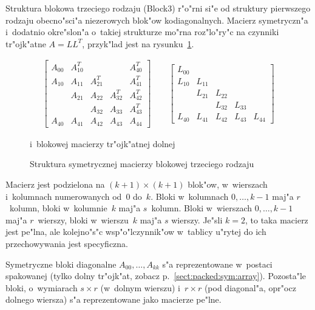 Struktura blokowa trzeciego rodzaju (Block3) r"o"rni si"e od struktury
pierwszego rodzaju obecno"sci"a niezerowych blok"ow kodiagonalnych.
Macierz symetryczn"a i~dodatnio okre"slon"a o~takiej strukturze mo"rna
roz"lo"ry"c na czynniki tr"ojk"atne $A=LL^T$, 
przyk"lad jest na rysunku~\ref{fig:block3:sympos}.
\begin{figure}[ht]
  \begin{align*}
    \left[\begin{array}{ccccc}
      A_{00} & A_{10}^T & & & A_{40}^T \\
      A_{10} & A_{11} & A_{21}^T & & A_{41}^T \\
      & A_{21} & A_{22} & A_{32}^T & A_{42}^T \\
      & & A_{32} & A_{33} & A_{43}^T \\
      A_{40} & A_{41} & A_{42} & A_{43} & A_{44}
    \end{array}\right] \qquad
    \left[\begin{array}{ccccc}
      L_{00} & & & & \\
      L_{10} & L_{11} & & & \\
      & L_{21} & L_{22} & & \\
      & & L_{32} & L_{33} & \\
      L_{40} & L_{41} & L_{42} & L_{43} & L_{44}
    \end{array}\right]
  \end{align*}
  \caption{\label{fig:block3:sympos}Struktura symetrycznej macierzy blokowej trzeciego rodzaju}
  \centerline{i~blokowej macierzy tr"ojk"atnej dolnej}
\end{figure}
Macierz jest podzielona na $(k+1)\times(k+1)$ blok"ow, w~wierszach i~kolumnach
numerowanych od~$0$ do~$k$. Bloki w~kolumnach $0,\ldots,k-1$ maj"a $r$~kolumn,
bloki w~kolumnie~$k$ maj"a $s$~kolumn. Bloki w~wierszach $0,\ldots,k-1$
maj"a $r$~wierszy, bloki w~wierszu~$k$ maj"a $s$ wierszy.
Je"sli $k=2$, to taka macierz jest pe"lna, ale kolejno"s"c wsp"o"lczynnik"ow
w~tablicy u"rytej do ich przechowywania jest specyficzna.

Symetryczne bloki diagonalne $A_{00},\ldots,A_{kk}$ s"a reprezentowane
w~postaci spakowanej (tylko dolny tr"ojk"at, zobacz
p.~\ref{sect:packed:sym:array}). Pozosta"le bloki, o~wymiarach $s\times r$
(w~dolnym wierszu) i~$r\times r$ (pod diagonal"a, opr"ocz dolnego wiersza)
s"a reprezentowane jako macierze pe"lne.


\vspace{\bigskipamount}


